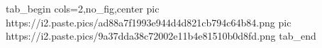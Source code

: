  
 
 
 
 


\ifcmt
  tab_begin cols=2,no_fig,center
     pic https://i2.paste.pics/ad88a7f1993e944d4d821cb794c64b84.png
		 pic https://i2.paste.pics/9a37dda38c72002e11b4e81510b0d8fd.png
  tab_end
\fi
